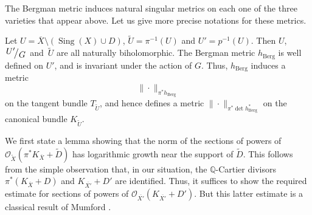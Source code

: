 \documentclass[10pt]{amsart}
\let\mathcal\mathscr
\theoremstyle{plain}
\theoremstyle{definition}
\numberwithin{equation}{theorem}
\DeclareMathOperator{\Sing}{Sing}
\newcommand{\bquotient}[2]{{\left.\raisebox{.2em}{$#1$}\big/\raisebox{-.2em}{$#2$}\right.}}
\newcommand{\norm}[1] { \| #1 \| }
\begin{document}
The Bergman metric induces natural singular metrics on each one of the three varieties that appear above. Let us give more precise notations for these metrics.

Let $U = \overline{X} \setminus \left( \Sing(X) \cup D \right)$, $\widetilde{U} = \pi^{-1}(U)$ and $U' = p^{-1}(U)$. Then $U$, $\bquotient{U'\!}{G}$ and~$\widetilde{U}$ are all naturally biholomorphic. The Bergman metric $h_{\mathrm{Berg}}$ is well defined on $U'$, and is invariant under the action of $G$. Thus, $h_{\mathrm{Berg}}$ induces a metric\vspace*{-1pt}
$$\norm{\cdot}_{\pi^\ast h_{\mathrm{Berg}}}$$
on the tangent bundle $T_{\widetilde{U}}$, and hence defines a metric $\norm{\cdot}_{ \pi^\ast \det h^\ast_{\mathrm{Berg}}}$ on the canonical bundle $K_{\widetilde{U}}$.

We first state a lemma showing that the norm of the sections of powers of $\mathcal O_{\widetilde{X}}( \pi^\ast K_{\overline{X}} + \widetilde{D})$ has logarithmic growth near the support of $\widetilde{D}$. This follows from the simple observation that, in our situation, the $\mathbb Q$-Cartier divisors $\pi^{\ast} \left( K_{\overline{X}} + D \right)$ and $K_{\overline{X'}} + D'$ are identified. Thus, it suffices to show the required estimate for sections of powers of $\mathcal O_{\overline{X'}} (K_{\overline{X'}} + D')$. But this latter estimate is a classical result of Mumford \cite{Mum77}.
\end{document}
